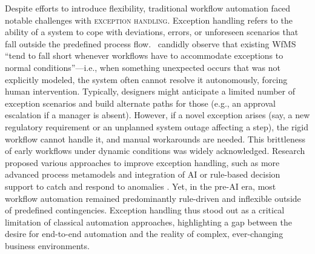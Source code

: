 Despite efforts to introduce flexibility, traditional workflow automation faced notable challenges with \textsc{exception handling}. Exception handling refers to the ability of a system to cope with deviations, errors, or unforeseen scenarios that fall outside the predefined process flow.~\textcite{basuResearch2002} candidly observe that existing WfMS “tend to fall short whenever workflows have to accommodate exceptions to normal conditions”---i.e., when something unexpected occurs that was not explicitly modeled, the system often cannot resolve it autonomously, forcing human intervention. Typically, designers might anticipate a limited number of exception scenarios and build alternate paths for those (e.g., an approval escalation if a manager is absent). However, if a novel exception arises (say, a new regulatory requirement or an unplanned system outage affecting a step), the rigid workflow cannot handle it, and manual workarounds are needed. This brittleness of early workflows under dynamic conditions was widely acknowledged. Research proposed various approaches to improve exception handling, such as more advanced process metamodels and integration of AI or rule-based decision support to catch and respond to anomalies \parencite{basuResearch2002}. Yet, in the pre-AI era, most workflow automation remained predominantly rule-driven and inflexible outside of predefined contingencies. Exception handling thus stood out as a critical limitation of classical automation approaches, highlighting a gap between the desire for end-to-end automation and the reality of complex, ever-changing business environments.

